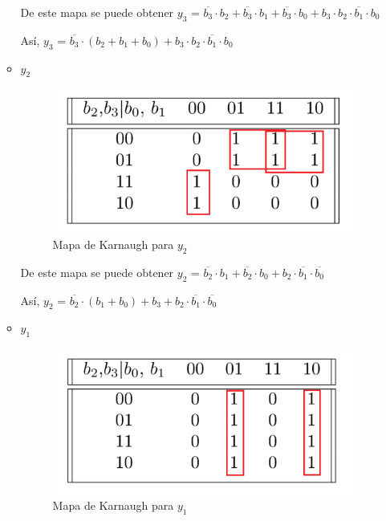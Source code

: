 \documentclass[../../informe/src/main.tex]{subfiles}
\begin{document}
\begin{enumerate}
\begin{itemize}
De este mapa se puede obtener $y_3$ = $\overline{b_{3}} \cdot b_{2} +\overline{b_{3}}\cdot b_{1} 
+\overline{b_{3}} \cdot b_{0} +b_{3}\cdot \overline{b_{2} \cdot b_{1} \cdot b_{0}} $ 
\par
Así, $y_3$ = $\overline{b_{3}} \cdot (b_{2} + b_{1} + b_{0}) + b_{3}\cdot \overline{b_{2} \cdot b_{1} \cdot b_{0}}$ 

\item $y_2$					

\begin{figure}[H]	%
	\centering
	\includegraphics[scale=0.5]{imagenes/karnaugh_mapa_y2.png}
	\caption{Mapa de Karnaugh para $y_2$}
	\label{fig:ej4_karnaugh_mapa_y2}
\end{figure}

De este mapa se puede obtener $y_2$ = $\overline{b_{2}} \cdot b_{1} + \overline{b_{2}} \cdot b_{0} + 
b_{2} \cdot \overline{b_{1}} \cdot \overline{b_{0}}  $ 
\par
Así, $y_2$ = $\overline{b_{2}} \cdot (b_{1} + b_{0}) + b_{3} + b_{2} \cdot \overline{b_{1}} \cdot \overline{b_{0}} $ 

\item $y_1$					

\begin{figure}[H]	%
	\centering
	\includegraphics[scale=0.5]{imagenes/karnaugh_mapa_y1.png}
	\caption{Mapa de Karnaugh para $y_1$}
	\label{fig:ej4_karnaugh_mapa_y1}
\end{figure}


\end{itemize}
\end{enumerate}
\end{document}
